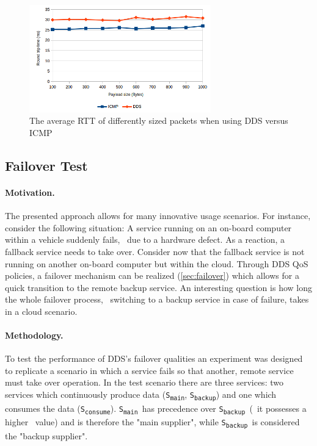 \begin{figure}[htpb]
  \centering
  \includegraphics[width=0.7\textwidth]{figures/dds-latency}
  \caption[DDS latency benchmark results]{The average RTT of differently sized packets when using DDS versus ICMP}\label{fig:dds-latency}
\end{figure}

%
%
%
%
%
%
%
%
%
%


\subsection{Failover Test}\label{sec:failovertest}

\paragraph{Motivation.} The presented approach allows for many innovative usage scenarios. For instance, consider the following situation: A service running on an on-board computer within a vehicle suddenly fails, \eg\ due to a hardware defect. As a reaction, a fallback service needs to take over. Consider now that the fallback service is not running on another on-board computer but within the cloud. Through DDS QoS policies, a failover mechanism can be realized (\cf \ref{sec:failover}) which allows for a quick transition to the remote backup service. An interesting question is how long the whole failover process, \ie\ switching to a backup service in case of failure, takes in a cloud scenario.


\newcommand{\proda}{\texttt{S\textsubscript{main}}}
\newcommand{\prodb}{\texttt{S\textsubscript{backup}}}
\newcommand{\cons}{\texttt{S\textsubscript{consume}}}

\paragraph{Methodology.} To test the performance of DDS's failover qualities an experiment was designed to replicate a scenario in which a service fails so that another, remote service must take over operation. In the test scenario there are three services: two services which continuously produce data (\proda , \prodb) and one which consumes the data (\cons). \proda\ has precedence over \prodb\ (\ie\ it possesses a higher \ownership\ value) and is therefore the "main supplier", while \prodb\ is considered the "backup supplier". 

